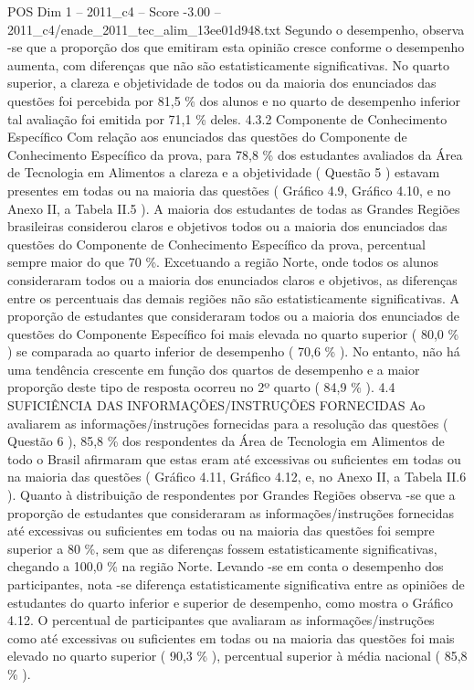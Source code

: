 \begin{textsample}{POS Dim 1 – 2011\_c4 – Score -3.00 – 2011\_c4/enade\_2011\_tec\_alim\_13ee01d948.txt}
Segundo o desempenho, observa -se que a proporção dos que emitiram esta opinião cresce conforme o desempenho aumenta, com diferenças que não são estatisticamente significativas.
No quarto superior, a clareza e objetividade de todos ou da maioria dos enunciados das questões foi percebida por 81,5 \% dos alunos e no quarto de desempenho inferior tal avaliação foi emitida por 71,1 \% deles. 4.3.2 Componente de Conhecimento Específico Com relação aos enunciados das questões do Componente de Conhecimento Específico da prova, para 78,8 \% dos estudantes avaliados da Área de Tecnologia em Alimentos a clareza e a objetividade ( Questão 5 ) estavam presentes em todas ou na maioria das questões ( Gráfico 4.9, Gráfico 4.10, e no Anexo II, a Tabela II.5 ).
A maioria dos estudantes de todas as Grandes Regiões brasileiras considerou claros e objetivos todos ou a maioria dos enunciados das questões do Componente de Conhecimento Específico da prova, percentual sempre maior do que 70 \%.
Excetuando a região Norte, onde todos os alunos consideraram todos ou a maioria dos enunciados claros e objetivos, as diferenças entre os percentuais das demais regiões não são estatisticamente significativas.
A proporção de estudantes que consideraram todos ou a maioria dos enunciados de questões do Componente Específico foi mais elevada no quarto superior ( 80,0 \% ) se comparada ao quarto inferior de desempenho ( 70,6 \% ).
No entanto, não há uma tendência crescente em função dos quartos de desempenho e a maior proporção deste tipo de resposta ocorreu no 2º quarto ( 84,9 \% ). 4.4 SUFICIÊNCIA DAS INFORMAÇÕES/INSTRUÇÕES FORNECIDAS Ao avaliarem as informações/instruções fornecidas para a resolução das questões ( Questão 6 ), 85,8 \% dos respondentes da Área de Tecnologia em Alimentos de todo o Brasil afirmaram que estas eram até excessivas ou suficientes em todas ou na maioria das questões ( Gráfico 4.11, Gráfico 4.12, e, no Anexo II, a Tabela II.6 ).
Quanto à distribuição de respondentes por Grandes Regiões observa -se que a proporção de estudantes que consideraram as informações/instruções fornecidas até excessivas ou suficientes em todas ou na maioria das questões foi sempre superior a 80 \%, sem que as diferenças fossem estatisticamente significativas, chegando a 100,0 \% na região Norte.
Levando -se em conta o desempenho dos participantes, nota -se diferença estatisticamente significativa entre as opiniões de estudantes do quarto inferior e superior de desempenho, como mostra o Gráfico 4.12.
O percentual de participantes que avaliaram as informações/instruções como até excessivas ou suficientes em todas ou na maioria das questões foi mais elevado no quarto superior ( 90,3 \% ), percentual superior à média nacional ( 85,8 \% ).

\end{textsample}
